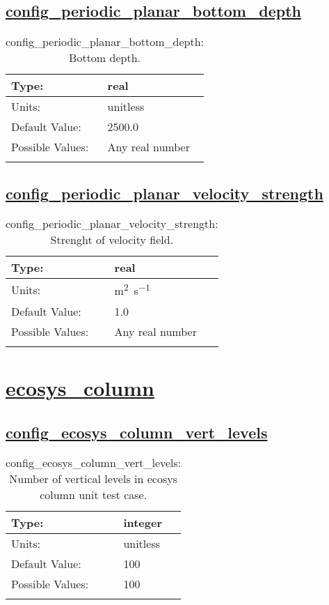 \subsection[config\_periodic\_planar\_bottom\_depth]{\hyperref[sec:nm_tab_periodic_planar]{config\_periodic\_planar\_bottom\_depth}}
\label{subsec:nm_sec_config_periodic_planar_bottom_depth}
\begin{center}
\begin{longtable}{| p{2.0in} || p{4.0in} |}
    \hline
    Type: & real \\
    \hline
    Units: & \si{unitless} \\
    \hline
    Default Value: & 2500.0 \\
    \hline
    Possible Values: & Any real number \\
    \hline
    \caption{config\_periodic\_planar\_bottom\_depth: Bottom depth.}
\end{longtable}
\end{center}
\subsection[config\_periodic\_planar\_velocity\_strength]{\hyperref[sec:nm_tab_periodic_planar]{config\_periodic\_planar\_velocity\_strength}}
\label{subsec:nm_sec_config_periodic_planar_velocity_strength}
\begin{center}
\begin{longtable}{| p{2.0in} || p{4.0in} |}
    \hline
    Type: & real \\
    \hline
    Units: & \si{m^2.s^{-1}} \\
    \hline
    Default Value: & 1.0 \\
    \hline
    Possible Values: & Any real number \\
    \hline
    \caption{config\_periodic\_planar\_velocity\_strength: Strenght of velocity field.}
\end{longtable}
\end{center}
\section[ecosys\_column]{\hyperref[sec:nm_tab_ecosys_column]{ecosys\_column}}
\label{sec:nm_sec_ecosys_column}
\subsection[config\_ecosys\_column\_vert\_levels]{\hyperref[sec:nm_tab_ecosys_column]{config\_ecosys\_column\_vert\_levels}}
\label{subsec:nm_sec_config_ecosys_column_vert_levels}
\begin{center}
\begin{longtable}{| p{2.0in} || p{4.0in} |}
    \hline
    Type: & integer \\
    \hline
    Units: & \si{unitless} \\
    \hline
    Default Value: & 100 \\
    \hline
    Possible Values: & 100 \\
    \hline
    \caption{config\_ecosys\_column\_vert\_levels: Number of vertical levels in ecosys column unit test case.}
\end{longtable}
\end{center}
